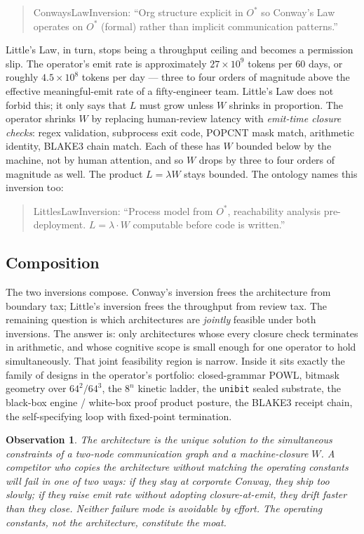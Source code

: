 \documentclass[11pt,letterpaper]{article}
\newtheorem{observation}{Observation}
\begin{document}
\begin{quote}
\small
\textsf{ConwaysLawInversion}: ``Org structure explicit in $O^{\ast}$ so Conway's Law operates on $O^{\ast}$ (formal) rather than implicit communication patterns.''
\end{quote}

Little's Law, in turn, stops being a throughput ceiling and becomes a permission slip. The operator's emit rate is approximately $27 \times 10^{9}$ tokens per 60 days, or roughly $4.5 \times 10^{8}$ tokens per day --- three to four orders of magnitude above the effective meaningful-emit rate of a fifty-engineer team. Little's Law does not forbid this; it only says that $L$ must grow unless $W$ shrinks in proportion. The operator shrinks $W$ by replacing human-review latency with \emph{emit-time closure checks}: regex validation, subprocess exit code, POPCNT mask match, arithmetic identity, BLAKE3 chain match. Each of these has $W$ bounded below by the machine, not by human attention, and so $W$ drops by three to four orders of magnitude as well. The product $L = \lambda W$ stays bounded. The ontology names this inversion too:

\begin{quote}
\small
\textsf{LittlesLawInversion}: ``Process model from $O^{\ast}$, reachability analysis pre-deployment. $L = \lambda \cdot W$ computable before code is written.''
\end{quote}

\subsection{Composition}

The two inversions compose. Conway's inversion frees the architecture from boundary tax; Little's inversion frees the throughput from review tax. The remaining question is which architectures are \emph{jointly} feasible under both inversions. The answer is: only architectures whose every closure check terminates in arithmetic, and whose cognitive scope is small enough for one operator to hold simultaneously. That joint feasibility region is narrow. Inside it sits exactly the family of designs in the operator's portfolio: closed-grammar POWL, bitmask geometry over $64^{2}/64^{3}$, the $8^{n}$ kinetic ladder, the \texttt{unibit} sealed substrate, the black-box engine / white-box proof product posture, the BLAKE3 receipt chain, the self-specifying loop with fixed-point termination.

\begin{observation}
The architecture is the \emph{unique} solution to the simultaneous constraints of a two-node communication graph and a machine-closure $W$. A competitor who copies the architecture without matching the operating constants will fail in one of two ways: if they stay at corporate Conway, they ship too slowly; if they raise emit rate without adopting closure-at-emit, they drift faster than they close. Neither failure mode is avoidable by effort. The operating constants, not the architecture, constitute the moat.
\end{observation}
\end{document}

